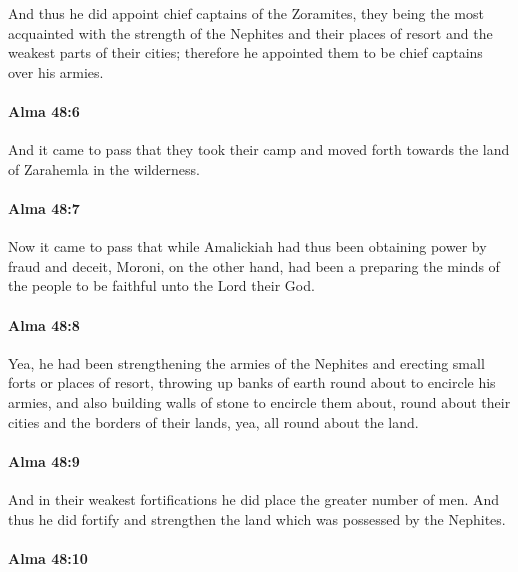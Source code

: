 			And thus he did appoint chief captains of the Zoramites,
			they being the most acquainted with the strength of the Nephites
			and their places of resort and the weakest parts of their cities;
			therefore he appointed them to be chief captains over his armies.

		\paragraph{Alma 48:6} %
			\label{ALMA-48-6}

			And it came to pass that they took their camp
			and moved forth towards the land of Zarahemla in the wilderness.

		\paragraph{Alma 48:7} %
			\label{ALMA-48-7}

			Now it came to pass that
			while Amalickiah had thus been obtaining power by fraud and deceit,
			Moroni, on the other hand, had been a preparing the minds of the people
			to be faithful unto the Lord their God.

		\paragraph{Alma 48:8} %
			\label{ALMA-48-8}

			Yea, he had been strengthening the armies of the Nephites
			and erecting small forts or places of resort,
			throwing up banks of earth round about to encircle his armies,
			and also building walls of stone to encircle them about,
			round about their cities and the borders of their lands,
			yea, all round about the land.

		\paragraph{Alma 48:9} %
			\label{ALMA-48-9}

			And in their weakest fortifications he did place the greater number of men.
			And thus he did fortify and strengthen the land
			which was possessed by the Nephites.

		\paragraph{Alma 48:10} %
			\label{ALMA-48-10}

